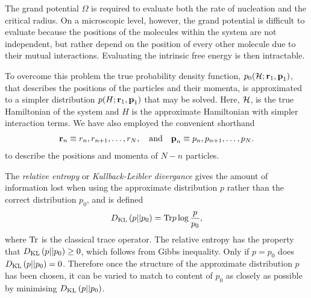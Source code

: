 The grand potential $\Omega$ is required to evaluate both the rate of nucleation and the critical radius.
%
On a microscopic level, however, the grand potential is difficult to evaluate
because the positions of the molecules within the system are not independent,
but rather depend on the position of every other molecule due to their mutual interactions.
Evaluating the intrinsic free energy is then intractable.

To overcome this problem 
the true probability density function, $p_0({\cal H}; {\mathbf{\textbf{r}}}_1,{\mathbf{\textbf{p}}}_1)$, that describes 
the positions of the particles and their momenta,
is approximated to a simpler distribution $p(H; {\mathbf{\textbf{r}}}_1, {\mathbf{\textbf{p}}}_1)$ that may be solved.
Here, ${\cal H}$, is the true Hamiltonian of the system 
and $H$ is the approximate Hamiltonian with simpler interaction terms.
We have also employed the  convenient shorthand
\begin{align}
{\mathbf{\textbf{r}}}_n \equiv r_n,r_{n+1},\ldots,r_N,  \quad\text{and}\quad
{\mathbf{\textbf{p}}}_n \equiv  p_n,p_{n+1},\ldots, p_N.
    \label{eqn:shorthand}
\end{align}
to describe the positions and momenta of  $N-n$ particles.

The {\em relative entropy } or {\em Kullback-Leibler divergance} gives the amount of information lost 
when using the approximate distribution  $p$ rather than the correct distribution $p_0$,
and is defined
\begin{align}
  D_{\text {KL}}\left( {p}||{p_0} \right) = \textrm{Tr} p \log \frac{p}{p_0}, \label{eqn:nuc:KLD}
\end{align}
where $\textrm{Tr}$ is the classical trace operator. %
The relative entropy has the property that 
$D_{\text {KL}}\left( {p}||{p_0} \right) \ge 0$, which follows from Gibbs inequality\cite{MacKayBook}.
Only if $p=p_0$ does $D_{\text {KL}}\left( {p}||{p_0} \right) = 0$.
Therefore once the structure of the approximate  distribution $p$ has been chosen,
it can be varied to match to content of $p_0$ as closely as possible by minimising $D_{\text {KL}}\left( {p}||{p_0} \right)$.

